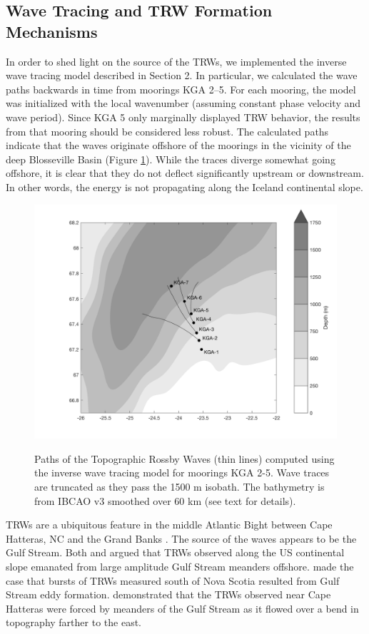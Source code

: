 \documentclass[12pt,titlepage,figuresatend]{article}
\begin{document}
\subsection{Wave Tracing and TRW Formation Mechanisms}

In order to shed light on the source of the TRWs, we implemented the inverse wave tracing model described in Section 2. In particular, we calculated the wave paths backwards in time from moorings KGA 2--5. For each mooring, the model was initialized with the local wavenumber (assuming constant phase velocity and wave period). Since KGA 5 only marginally displayed TRW behavior, the results from that mooring should be considered less robust. The calculated paths indicate that the waves originate offshore of the moorings in the vicinity of the deep Blosseville Basin (Figure \ref{fig_waveTrace}). While the traces diverge somewhat going offshore, it is clear that they do not deflect significantly upstream or downstream. In other words, the energy is not propagating along the Iceland continental slope.

\begin{figure}[p!]
  \centering\includegraphics[width=\hsize]{./figures/wave_trace.pdf}
  \caption{Paths of the Topographic Rossby Waves (thin lines) computed using the inverse wave tracing model for moorings KGA 2-5. Wave traces are truncated as they pass the 1500 m isobath. The bathymetry is from IBCAO v3 smoothed over 60 km (see text for details).}{\label{fig_waveTrace}}
\end{figure}

TRWs are a ubiquitous feature in the middle Atlantic Bight between Cape Hatteras, NC and the Grand Banks \cite[]{Louis1982,Johns1986,Pickart1990}. The source of the waves appears to be the Gulf Stream. Both \cite{Hogg1981} and \cite{Schultz1987} argued that TRWs observed along the US continental slope emanated from large amplitude Gulf Stream meanders offshore. \cite{Louis1982} made the case that bursts of TRWs measured south of Nova Scotia resulted from Gulf Stream eddy formation. \cite{Pickart1995} demonstrated that the TRWs observed near Cape Hatteras were forced by meanders of the Gulf Stream as it flowed over a bend in topography farther to the east. 
\end{document}
